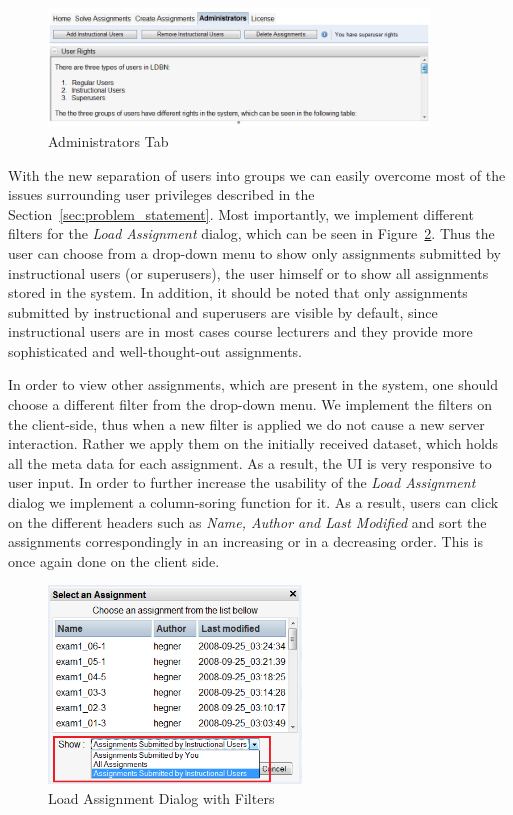 \begin{figure}[ht]
	\begin{center}
		\includegraphics[width=0.9\textwidth]{./img/admin-ui.png}
		\caption{Administrators Tab}
		\label{fig:admin-ui}
	\end{center}
\end{figure}

With the new separation of users into groups we can easily overcome most of 
the issues surrounding user privileges described in the Section~\ref{sec:problem_statement}.
Most importantly, we implement different filters for the \emph{Load Assignment} dialog,
which can be seen in Figure~\ref{fig:load-assg}. Thus the user can choose from 
a drop-down menu to show only assignments submitted by instructional users 
(or superusers), the user himself or to show all assignments stored in the system. 
In addition, it should be noted that only assignments submitted
by instructional and superusers are visible by default, since instructional users are in most
cases course lecturers and they provide more sophisticated and 
well-thought-out assignments. 

In order to view other assignments, which are present in the system, 
one should choose a different filter from the drop-down menu. 
We implement the filters on the client-side, thus when a new filter is
applied we do not cause a new server interaction. Rather we apply them
on the initially received dataset, which holds all the meta data for each assignment.
As a result, the UI is very responsive to user input. 
In order to further increase the usability of the \emph{Load Assignment} dialog
we implement a column-soring function for it. As a result, users can click on
the different headers such as \emph{Name, Author and Last Modified} and sort the 
assignments correspondingly in an increasing or in a decreasing order. This is once
again done on the client side. 

\begin{figure}[ht]
	\begin{center}
		\includegraphics[width=0.6\textwidth]{./img/load-assg.png}
		\caption{Load Assignment Dialog with Filters}
		\label{fig:load-assg}
	\end{center}
\end{figure}

